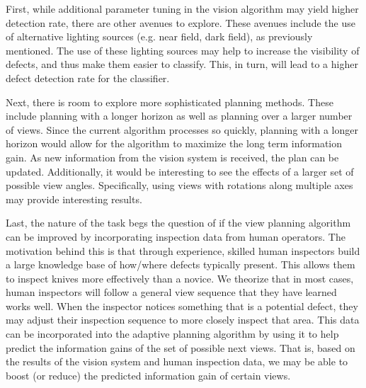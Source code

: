 \documentclass[letterpaper, 10 pt, conference]{ieeeconf}  %
\begin{document}
First, while additional parameter tuning in the vision algorithm may yield higher detection rate, there are other avenues to explore. These avenues include the use of alternative lighting sources (e.g. near field, dark field), as previously mentioned. The use of these lighting sources may help to increase the visibility of defects, and thus make them easier to classify. This, in turn, will lead to a higher defect detection rate for the classifier.

Next, there is room to explore more sophisticated planning methods. These include planning with a longer horizon as well as planning over a larger number of views. Since the current algorithm processes so quickly, planning with a longer horizon would allow for the algorithm to maximize the long term information gain. As new information from the vision system is received, the plan can be updated. Additionally, it would be interesting to see the effects of a larger set of possible view angles. Specifically, using views with rotations along multiple axes may provide interesting results.

Last, the nature of the task begs the question of if the view planning algorithm can be improved by incorporating inspection data from human operators. The motivation behind this is that through experience, skilled human inspectors build a large knowledge base of how/where defects typically present. This allows them to inspect knives more effectively than a novice. We theorize that in most cases, human inspectors will follow a general view sequence that they have learned works well. When the inspector notices something that is a potential defect, they may adjust their inspection sequence to more closely inspect that area. This data can be incorporated into the adaptive planning algorithm by using it to help predict the information gains of the set of possible next views. That is, based on the results of the vision system and human inspection data, we may be able to boost (or reduce) the predicted information gain of certain views.



\end{document}
